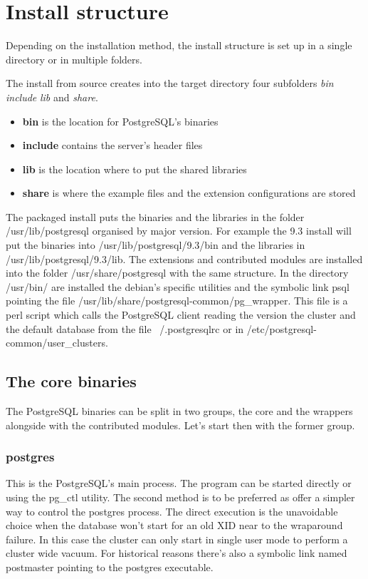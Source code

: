 \chapter{Install structure}\label{cha:INSTALLSTRUCT}
Depending on the installation method, the install structure is set up in a single directory or 
in multiple folders.\newline

The install from source creates into the target directory four subfolders \textit{bin} 
\textit{include} \textit{lib} and \textit{share}.

\begin{itemize}
 \item \textbf{bin} is the location for PostgreSQL's binaries
 \item \textbf{include} contains the server's header files
 \item \textbf{lib} is the location where to put the shared libraries
 \item \textbf{share} is where the example files and the extension configurations are stored
\end{itemize}


The packaged install puts the binaries and the libraries in the folder /usr/lib/postgresql 
organised by major version. For example the 9.3 install will put the binaries into 
/usr/lib/postgresql/9.3/bin and the libraries in /usr/lib/postgresql/9.3/lib. The extensions and 
contributed modules are installed into the folder /usr/share/postgresql with the same structure. In 
the directory /usr/bin/ are installed the debian's specific utilities and the symbolic link psql 
pointing the file /usr/lib/share/postgresql-common/pg\_wrapper. This file is a perl script which 
calls the PostgreSQL client reading the version the cluster and the default database from the file 
~/.postgresqlrc or in /etc/postgresql-common/user\_clusters.\newline


\section{The core binaries}
The PostgreSQL binaries can be split in two groups, the core and the wrappers alongside with the 
contributed modules. Let's start then with the former group.

\subsection{postgres}
\label{sec:POSTGRES}
This is the PostgreSQL's main process. The program can be started directly or using the pg\_ctl 
utility. The second method is to be preferred as offer a simpler way to control the postgres 
process. The direct execution is the unavoidable choice when the database won't start for an old XID 
near to the wraparound failure. 
In this case the cluster can only start in single user mode to perform a cluster wide vacuum. For 
historical reasons there's also a symbolic link named postmaster pointing to the postgres 
executable.

